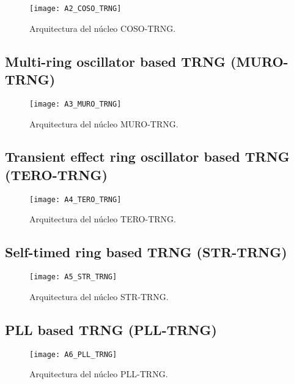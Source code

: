 				
				\begin{figure}[hbtp]
					\caption{Arquitectura del núcleo COSO-TRNG.}
					\centering
					\texttt{[image: A2\_COSO\_TRNG]}
					\label{fig:A2_COSO_TRNG}
				\end{figure}
				
				
				
		\subsection{Multi-ring oscillator based TRNG (MURO-TRNG)}
	
				
				\begin{figure}[hbtp]
					\caption{Arquitectura del núcleo MURO-TRNG.}
					\centering
					\texttt{[image: A3\_MURO\_TRNG]}
					\label{fig:A3_MURO_TRNG}
				\end{figure}
				
				
				
		\subsection{Transient effect ring oscillator based TRNG (TERO-TRNG)}
	
				
				\begin{figure}[hbtp]
					\caption{Arquitectura del núcleo TERO-TRNG.}
					\centering
					\texttt{[image: A4\_TERO\_TRNG]}
					\label{fig:A4_TERO_TRNG}
				\end{figure}
				
				
				
		\subsection{Self-timed ring based TRNG (STR-TRNG)}
	
				
				\begin{figure}[hbtp]
					\caption{Arquitectura del núcleo STR-TRNG.}
					\centering
					\texttt{[image: A5\_STR\_TRNG]}
					\label{fig:A5_STR_TRNG}
				\end{figure}
				
				
				
		\subsection{PLL based TRNG (PLL-TRNG)}
	
				
				\begin{figure}[hbtp]
					\caption{Arquitectura del núcleo PLL-TRNG.}
					\centering
					\texttt{[image: A6\_PLL\_TRNG]}
					\label{fig:A6_PLL_TRNG}
				\end{figure}
				
